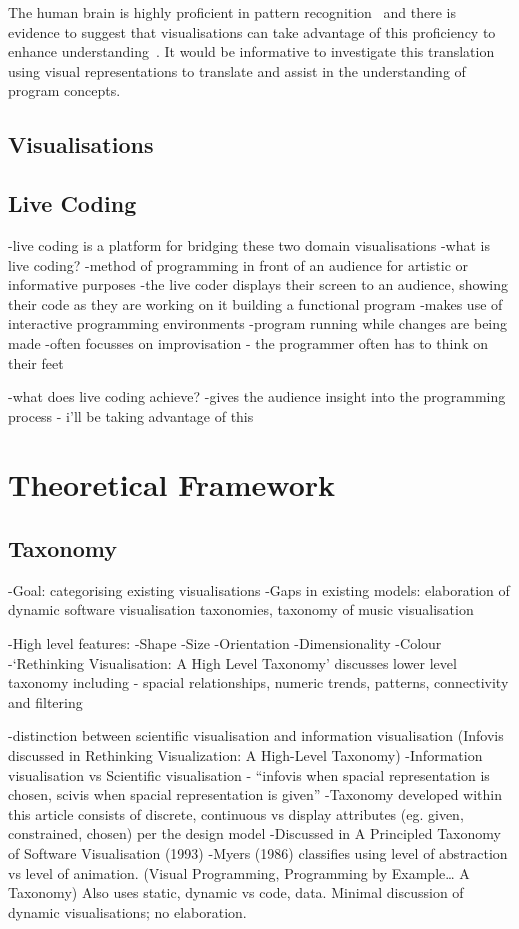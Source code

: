 The human brain is highly proficient in pattern recognition~\cite{ware2013information} and there is evidence to suggest that visualisations can take advantage of this proficiency to enhance understanding~\cite{najjar1998principles}. It would be informative to investigate this translation using visual representations to translate and assist in the understanding of program concepts.\\

\subsection{Visualisations}


\subsection{Live Coding}

-live coding is a platform for bridging these two domain visualisations 
-what is live coding?
-method of programming in front of an audience for artistic or informative purposes
-the live coder displays their screen to an audience, showing their code as they are working on it building a functional program
-makes use of interactive programming environments 
-program running while changes are being made 
-often focusses on improvisation - the programmer often has to think on their feet

-what does live coding achieve?
-gives the audience insight into the programming process - i’ll be taking advantage of this


\section{Theoretical Framework}
\label{sec:framework}


\subsection{Taxonomy}


-Goal: categorising existing visualisations
-Gaps in existing models: elaboration of dynamic software visualisation taxonomies, taxonomy of music visualisation

-High level features:
	-Shape
	-Size
	-Orientation
	-Dimensionality
	-Colour
-‘Rethinking Visualisation: A High Level Taxonomy' discusses lower level taxonomy including - spacial relationships, numeric trends, patterns, connectivity and filtering

-distinction between scientific visualisation and information visualisation (Infovis discussed in Rethinking Visualization: A High-Level Taxonomy)
-Information visualisation vs Scientific visualisation - “infovis when spacial representation is chosen, scivis when spacial representation is given”
-Taxonomy developed within this article consists of {discrete, continuous} vs display attributes (eg. given, constrained, chosen) per the design model
-Discussed in A Principled Taxonomy of Software Visualisation (1993)
-Myers (1986) classifies using level of abstraction vs level of animation. (Visual Programming, Programming by Example… A Taxonomy) Also uses {static, dynamic} vs {code, data}. Minimal discussion of dynamic visualisations; no elaboration.

